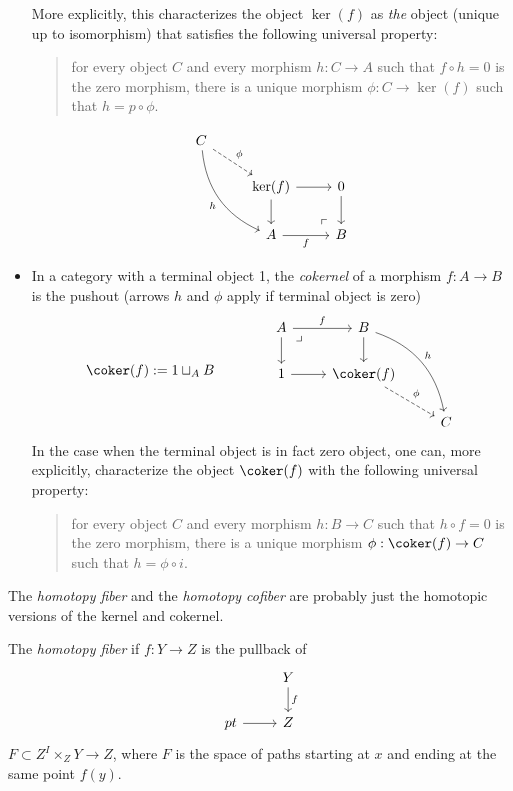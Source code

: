 \begin{definition}
\begin{definition}
\begin{itemize}
		More explicitly, this characterizes the object $\ker(f)$ as \textit{the} object (unique up to isomorphism) that satisfies the following universal property:
		\begin{quote}
			for every object $C$ and every morphism $h:C\to A$ such that $f\circ h=0$ is the zero morphism, there is a unique morphism $\phi:C\to\ker(f)$ such that $h=p\circ\phi$.
		\end{quote}
		$$\begin{tikzcd}
			C\arrow[dr,dashed,"\phi"]\arrow[ddr,bend right,swap,"h"]\\
			&\ker(f)\arrow[d]\arrow[r]&0\arrow[d]\\
			&A\arrow[r,"f",swap]&B\arrow[ul, phantom, "\ulcorner", very near start]
		\end{tikzcd}$$
		\item In a category with a terminal object 1, the {\it cokernel} of a morphism $f:A\to B$ is the pushout (arrows $h$ and $\phi$ apply if terminal object is zero)
		$$\coker(f):=1\sqcup_AB\qquad\qquad\begin{tikzcd}
			A\arrow[r,"f"]\arrow[d]\arrow[dr, phantom, "\lrcorner", very near start]&B\arrow[d]\arrow[rdd,bend left,"h"]\\
			1\arrow[r]&\coker(f)\arrow[dr,dashed,"\phi"]\\
			&&C
		\end{tikzcd}$$
		In the case when the terminal object is in fact zero object, one can, more explicitly, characterize the object $\coker(f)$ with the following universal property:
		\begin{quote}
			for every object $C$ and every morphism $h:B\to C$ such that $h\circ f=0$ is the zero morphism, there is a unique morphism $\phi:\coker(f)\to C$ such that $h=\phi\circ i$.
		\end{quote}
\end{itemize}
\end{definition}
{\color{magenta}The {\it homotopy fiber} and the  {\it homotopy cofiber} are probably just the homotopic versions of the kernel and cokernel.}

\begin{definition}
	The {\it homotopy fiber} if $f:Y\to Z$ is the pullback of
		$$\begin{tikzcd}
			&Y\arrow[d,"f"]\\
			pt\arrow[r]&Z
		\end{tikzcd}$$
		$F\subset Z^I\times_ZY\to Z$, where $F$ is the space of paths starting at $x$ and ending at the same point $f(y)$.
\end{definition}


\end{definition}
